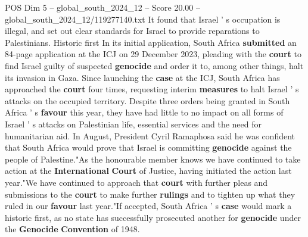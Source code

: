 \begin{textsample}{POS Dim 5 – global\_south\_2024\_12 – Score 20.00 – global\_south\_2024\_12/119277140.txt}
It found that Israel ' s occupation is illegal, and set out clear standards for Israel to provide reparations to Palestinians.
Historic first In its initial application, South Africa \textbf{submitted} an 84-page application at the ICJ on 29 December 2023, pleading with the \textbf{court} to find Israel guilty of suspected \textbf{genocide} and order it to, among other things, halt its invasion in Gaza.
Since launching the \textbf{case} at the ICJ, South Africa has approached the \textbf{court} four times, requesting interim \textbf{measures} to halt Israel ' s attacks on the occupied territory.
Despite three orders being granted in South Africa ' s \textbf{favour} this year, they have had little to no impact on all forms of Israel ' s attacks on Palestinian life, essential services and the need for humanitarian aid.
In August, President Cyril Ramaphosa said he was confident that South Africa would prove that Israel is committing \textbf{genocide} against the people of Palestine."As the honourable member knows we have continued to take action at the \textbf{International} \textbf{Court} of Justice, having initiated the action last year."We have continued to approach that \textbf{court} with further pleas and submissions to the \textbf{court} to make further \textbf{rulings} and to tighten up what they ruled in our \textbf{favour} last year."If accepted, South Africa ' s \textbf{case} would mark a historic first, as no state has successfully prosecuted another for \textbf{genocide} under the \textbf{Genocide} \textbf{Convention} of 1948.

\end{textsample}

